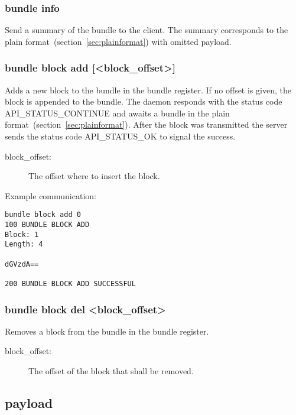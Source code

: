 \documentclass[12pt, a4paper]{scrartcl}
\begin{document}
\subsubsection*{bundle info}
Send a summary of the bundle to the client.
The summary corresponds to the plain format~(section~\ref{sec:plainformat}) with omitted payload.
\subsubsection*{bundle block add [<block\_offset>]}
Adds a new block to the bundle in the bundle register.
If no offset is given, the block is appended to the bundle.
The daemon responds with the status code API\_STATUS\_CONTINUE and awaits a bundle in the plain format~(section~\ref{sec:plainformat}).
After the block was transmitted the server sends the status code API\_STATUS\_OK to signal the success.
\begin{description}
\item[block\_offset:] The offset where to insert the block.
\end{description}
Example communication:\\
\makebox[\textwidth]{\hrulefill}
\begin{verbatim}
bundle block add 0
100 BUNDLE BLOCK ADD
Block: 1
Length: 4

dGVzdA==

200 BUNDLE BLOCK ADD SUCCESSFUL
\end{verbatim}
\makebox[\textwidth]{\hrulefill}
\subsubsection*{bundle block del <block\_offset>}
Removes a block from the bundle in the bundle register.
\begin{description}
\item[block\_offset:] The offset of the block that shall be removed.
\end{description}
\subsection{payload}
\end{document}
